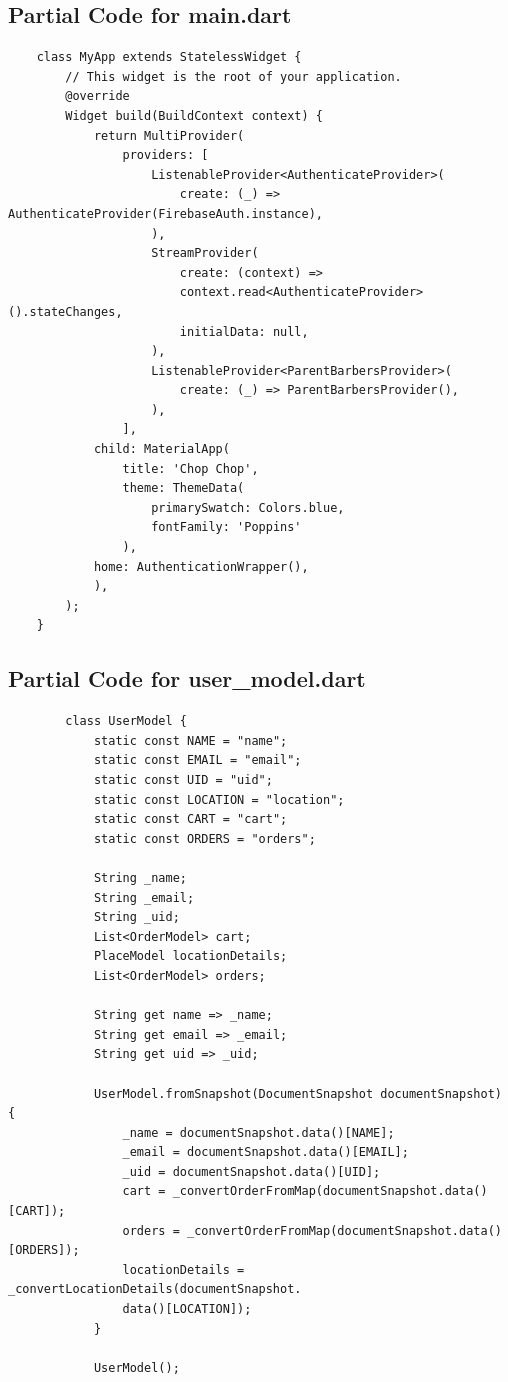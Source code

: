 \documentclass[12pt]{article}
\begin{document}
	\subsection{Partial Code for main.dart}
	\label{code:MyApp}
	\begin{verbatim}
	class MyApp extends StatelessWidget {
		// This widget is the root of your application.
		@override
		Widget build(BuildContext context) {
			return MultiProvider(
				providers: [
					ListenableProvider<AuthenticateProvider>(
						create: (_) => AuthenticateProvider(FirebaseAuth.instance),
					),
					StreamProvider(
						create: (context) =>
						context.read<AuthenticateProvider>().stateChanges, 
						initialData: null,
					),
					ListenableProvider<ParentBarbersProvider>(
						create: (_) => ParentBarbersProvider(),
					),
				],
			child: MaterialApp(
				title: 'Chop Chop',
				theme: ThemeData(
					primarySwatch: Colors.blue,
					fontFamily: 'Poppins'
				),
			home: AuthenticationWrapper(),
			),
		);
	}
	\end{verbatim}

	\subsection{Partial Code for user\_model.dart}
	\label{code:user-model}
	\begin{verbatim}
		class UserModel {
			static const NAME = "name";
			static const EMAIL = "email";
			static const UID = "uid";
			static const LOCATION = "location";
			static const CART = "cart";
			static const ORDERS = "orders";
			
			String _name;
			String _email;
			String _uid;
			List<OrderModel> cart;
			PlaceModel locationDetails;
			List<OrderModel> orders;
			
			String get name => _name;
			String get email => _email;
			String get uid => _uid;
			
			UserModel.fromSnapshot(DocumentSnapshot documentSnapshot) {
				_name = documentSnapshot.data()[NAME];
				_email = documentSnapshot.data()[EMAIL];
				_uid = documentSnapshot.data()[UID];
				cart = _convertOrderFromMap(documentSnapshot.data()[CART]);
				orders = _convertOrderFromMap(documentSnapshot.data()[ORDERS]);
				locationDetails = _convertLocationDetails(documentSnapshot.
				data()[LOCATION]);
			}
			
			UserModel();
	\end{verbatim}



	
\end{document}
